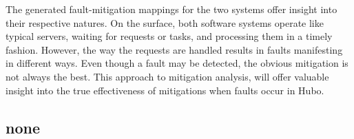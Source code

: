 The generated fault-mitigation mappings for the two systems offer insight into their respective natures. On the surface, both software systems operate like typical servers, waiting for requests or tasks, and processing them in a timely fashion. However, the way the requests are handled results in faults manifesting in different ways. Even though a fault may be detected, the obvious mitigation is not always the best. This approach to mitigation analysis, will offer valuable insight into the true effectiveness of mitigations when faults occur in Hubo.




\subsection{none}











